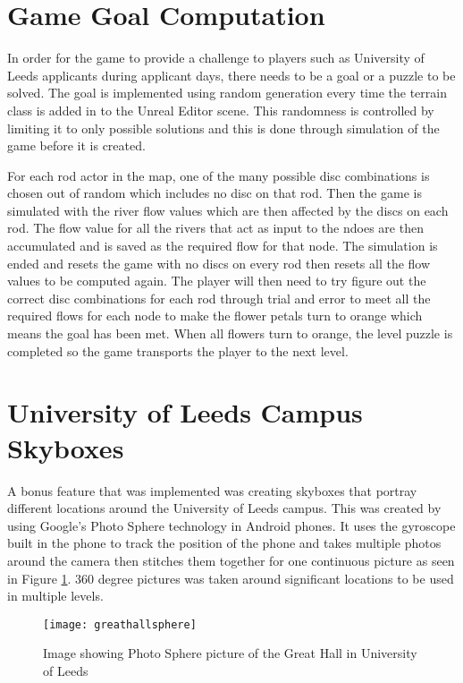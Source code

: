 \section{Game Goal Computation}
In order for the game to provide a challenge to players such as University of Leeds applicants during applicant days, there needs to be a goal or a puzzle to be solved. The goal is implemented using random generation every time the terrain class is added in to the Unreal Editor scene. This randomness is controlled by limiting it to only possible solutions and this is done through simulation of the game before it is created.
\newline
\par
For each rod actor in the map, one of the many possible disc combinations is chosen out of random which includes no disc on that rod. Then the game is simulated with the river flow values which are then affected by the discs on each rod. The flow value for all the rivers that act as input to the ndoes are then accumulated and is saved as the required flow for that node. The simulation is ended and resets the game with no discs on every rod then resets all the flow values to be computed again. The player will then need to try figure out the correct disc combinations for each rod through trial and error to meet all the required flows for each node to make the flower petals turn to orange which means the goal has been met. When all flowers turn to orange, the level puzzle is completed so the game transports the player to the next level.

\section{University of Leeds Campus Skyboxes}
A bonus feature that was implemented was creating skyboxes that portray different locations around the University of Leeds campus. This was created by using Google's Photo Sphere technology in Android phones. It uses the gyroscope built in the phone to track the position of the phone and takes multiple photos around the camera then stitches them together for one continuous picture as seen in Figure \ref{fig:greathallsphere}. 360 degree pictures was taken around significant locations to be used in multiple levels. 

\begin{figure}[h]
	\texttt{[image: greathallsphere]}
	\centering
	\caption{Image showing Photo Sphere picture of the Great Hall in University of Leeds}
	\label{fig:greathallsphere}
\end{figure}

